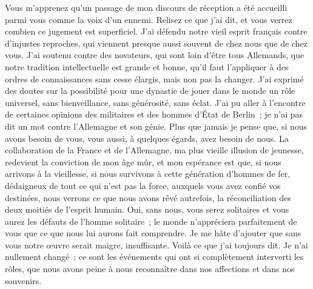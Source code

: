 \documentclass[french,twoside]{book} %
\newcommand\orgName[1]{#1}
\newcommand{\dateline}[1]{\medskip{\RaggedLeft{#1}\par}\bigskip}
\newcommand{\salute}[1]{\bigbreak{#1}\par\medbreak}
\begin{document}
\dateline{Journal des débats, 16 avril 1879}

\salute{Mon cher ami,}
\noindent Vous m’apprenez qu’un passage de mon discours de réception a été accueilli parmi vous comme la voix d’un ennemi. Relisez ce que j’ai dit, et vous verrez combien ce jugement est superficiel. J’ai défendu notre vieil esprit français contre d’injustes reproches, qui viennent presque aussi souvent de chez nous que de chez vous. J’ai soutenu contre des novateurs, qui sont loin d’être tous {\orgName Allemands}, que notre tradition intellectuelle est grande et bonne, qu’il faut l’appliquer à des ordres de connaissances sans cesse élargis, mais non pas la changer. J’ai exprimé des doutes sur la possibilité pour une dynastie de jouer dans le monde un rôle universel, sans bienveillance, sans générosité, sans éclat. J’ai pu aller à l’encontre de certaines opinions des militaires et des hommes d’État de Berlin ; je n’ai pas dit un mot contre l’{\orgName Allemagne} et son génie. Plus que jamais je pense que, si nous avons besoin de vous, vous aussi, à quelques égards, avez besoin de nous. La collaboration de la {\orgName France} et de l’{\orgName Allemagne}, ma plus vieille illusion de jeunesse, redevient la conviction de mon âge mûr, et mon espérance est que, si nous arrivons à la vieillesse, si nous survivons à cette génération d’hommes de fer, dédaigneux de tout ce qui n’est pas la force, auxquels vous avez confié vos destinées, nous verrons ce que nous avons rêvé autrefois, la réconciliation des deux moitiés de l’esprit humain. Oui, sans nous, vous serez solitaires et vous aurez les défauts de l’homme solitaire ; le monde n’appréciera parfaitement de vous que ce que nous lui aurons fait comprendre. Je me hâte d’ajouter que sans vous notre œuvre serait maigre, insuffisante. Voilà ce que j’ai toujours dit. Je n’ai nullement changé ; ce sont les événements qui ont si complètement interverti les rôles, que nous avons peine à nous reconnaître dans nos affections et dans nos souvenirs.\par
\end{document}
